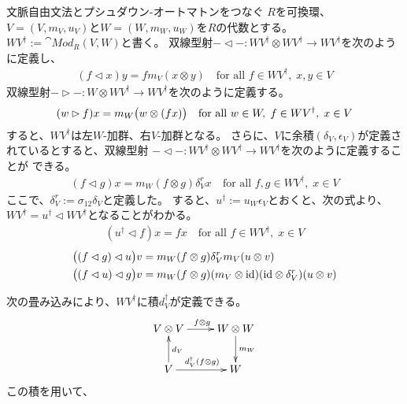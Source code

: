 {	文脈自由文法とプシュダウン-オートマトンをつなぐ
	$R$を可換環、$V=(V,m_V,u_V)$と$W=(W,m_W,u_W)$を$R$の代数とする。
	$WV^\dag:=\cat{Mod}_R(V,W)$と書く。
	双線型射$-\lhd-:WV^\dag\otimes WV^\dag\to WV^\dag$を次のように定義し、
	\begin{equation*}\begin{split}
		(f\lhd x) y = fm_V(x\otimes y)
		\quad\text{for all } f\in WV^\dag,\;x,y\in V
	\end{split}\end{equation*}
	双線型射$-\rhd-:W\otimes WV^\dag\to WV^\dag$を次のように定義する。
	\begin{equation*}\begin{split}
		(w\rhd f) x = m_W\bigl({w\otimes (fx)}\bigr)
		\quad\text{for all } w\in W,\; f\in WV^\dag,\;x\in V
	\end{split}\end{equation*}
	すると、$WV^\dag$は左$W$-加群、右$V$-加群となる。
	さらに、$V$に余積$(\delta_V,\epsilon_V)$が定義されているとすると、双線型射
	$-\lhd-:WV^\dag\otimes WV^\dag\to WV^\dag$を次のように定義することが
	できる。
	\begin{equation*}\begin{split}
		(f\lhd g) x = m_W(f\otimes g)\delta_V^r x
		\quad\text{for all } f,g\in WV^\dag,\;x\in V
	\end{split}\end{equation*}
	ここで、$\delta_V^r:=\sigma_{12}\delta_V$と定義した。
	すると、$u^\dag:=u_W\epsilon_V$とおくと、次の式より、
	$WV^\dag=u^\dag\lhd WV^\dag$となることがわかる。
	\begin{equation*}\begin{split}
		(u^\dag\lhd f)x = fx \quad\text{for all } f\in WV^\dag,\; x\in V
	\end{split}\end{equation*}
	\begin{equation*}\begin{split}
		\bigl({(f\lhd g)\lhd u}\bigr) v &= m_W(f\otimes g)\delta_V^r m_V (u\otimes v) \\
		\bigl({(f\lhd u)\lhd g}\bigr) v &= m_W(f\otimes g)(m_V\otimes{\ensuremath{\operatorname{id}}})
			({\operatorname{id}}\otimes\delta_V^r)(u\otimes v) \\
	\end{split}\end{equation*}

	次の畳み込みにより、$WV^\dag$に積$d_V^\dag$が定義できる。
	\begin{equation*}\xymatrix{
		V\otimes V \ar[r]^{f\otimes g} & W\otimes W \ar[d]^{m_W} \\
		V \ar[u]_{d_V} \ar[r]^{d_V^\dag(f\otimes g)} & W \\
	}\end{equation*}
	この積を用いて、
%
}\endgroup %
